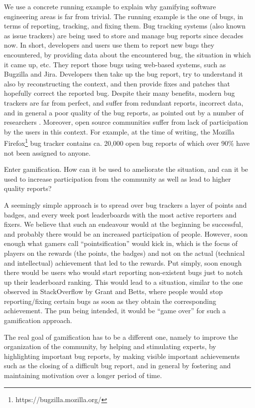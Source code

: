 We use a concrete running example to explain why gamifying software engineering areas is far from trivial. The running example is the one of bugs, in terms of reporting, tracking, and fixing them. Bug tracking systems (also known as issue trackers) are being used to store and manage bug reports since decades now. In short, developers and users use them to report new bugs they encountered, by providing data about the encountered bug, the situation in which it came up, etc. They report those bugs using web-based systems, such as Bugzilla and Jira. Developers then take up the bug report, try to understand it also by reconstructing the context, and then provide fixes and patches that hopefully correct the reported bug. Despite their many benefits, modern bug trackers are far from perfect, and suffer from redundant reports, incorrect data, and in general a poor quality of the bug reports, as pointed out by a number of researchers \cite{Bird2009a} \cite{Zimm2010a}. Moreover, open source communities suffer from lack of participation by the users in this context. For example, at the time of writing, the Mozilla Firefox\footnote{https://bugzilla.mozilla.org/} bug tracker contains ca. 20,000 open bug reports of which over 90\% have not been assigned to anyone. 

Enter gamification. How can it be used to ameliorate the situation, and can it be used to increase participation from the community as well as lead to higher quality reports?

A seemingly simple approach is to spread over bug trackers a layer of points and badges, and every week post leaderboards with the most active reporters and fixers. We believe that such an endeavour would at the beginning be successful, and probably there would be an increased participation of people. However, soon enough what gamers call ``pointsification'' would kick in, which is the focus of players on the rewards (the points, the badges) and not on the actual (technical and intellectual) achievement that led to the rewards. Put simply, soon enough there would be users who would start reporting non-existent bugs just to notch up their leaderboard ranking. This would lead to a situation, similar to the one observed in StackOverflow by Grant and Betts, where people would stop reporting/fixing certain bugs as soon as they obtain the corresponding achievement. The pun being intended, it would be ``game over'' for such a gamification approach.

The real goal of gamification has to be a different one, namely to improve the organization of the community, by helping and stimulating experts, by highlighting important bug reports, by making visible important achievements such as the closing of a difficult bug report, and in general by fostering and maintaining motivation over a longer period of time. 

